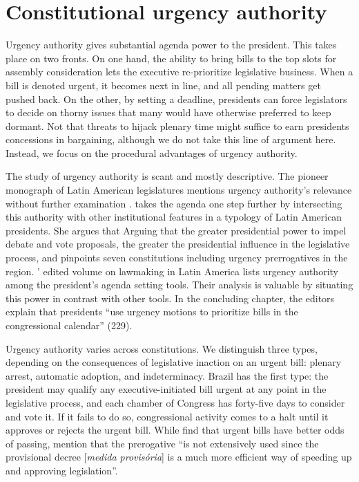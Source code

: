 \documentclass[letter,12pt]{article}
\begin{document}

\section{Constitutional urgency authority}

Urgency authority gives substantial agenda power to the president. This takes place on two fronts. On one hand, the ability to bring bills to the top slots for assembly consideration lets the executive re-prioritize legislative business. When a bill is denoted urgent, it becomes next in line, and all pending matters get pushed back. On the other, by setting a deadline, presidents can force legislators to decide on thorny issues that many would have otherwise preferred to keep dormant. Not that threats to hijack plenary time might suffice to earn presidents concessions in bargaining, although we do not take this line of argument here. Instead, we focus on the procedural advantages of urgency authority.

The study of urgency authority is scant and mostly descriptive. The pioneer monograph of Latin American legislatures mentions urgency authority's relevance without further examination \citep{morgenstern.nacif.2002}. \citet{garcia.montero.presidentes.2009} takes the agenda one step further by intersecting this authority with other institutional features in a typology of Latin American presidents. She argues that Arguing that the greater presidential power to impel debate and vote proposals, the greater the presidential influence in the legislative process, and pinpoints seven constitutions including urgency prerrogatives in the region. \citeauthor{aleman-tsebelis-2016-book}' \citeyearpar{aleman-tsebelis-2016-book} edited volume on lawmaking in Latin America lists urgency authority among the president's agenda setting tools. Their analysis is valuable by situating this power in contrast with other tools. In the concluding chapter, the editors explain that presidents ``use urgency motions to prioritize bills in the congressional calendar'' (229). 

Urgency authority varies across constitutions. We distinguish three types, depending on the consequences of legislative inaction on an urgent bill: plenary arrest, automatic adoption, and indeterminacy. Brazil has the first type: the president may qualify any executive-initiated bill urgent at any point in the legislative process, and each chamber of Congress has forty-five days to consider and vote it. If it fails to do so, congressional activity comes to a halt until it approves or rejects the urgent bill. While \citet{hiroi-renno-2016} find that urgent bills have better odds of passing, \citet[][:164]{figueiredo.limongi.2000} mention that the prerogative ``is not extensively used since the provisional decree [\emph{medida provis\'oria}] is a much more efficient way of speeding up and approving legislation''.
\end{document}
